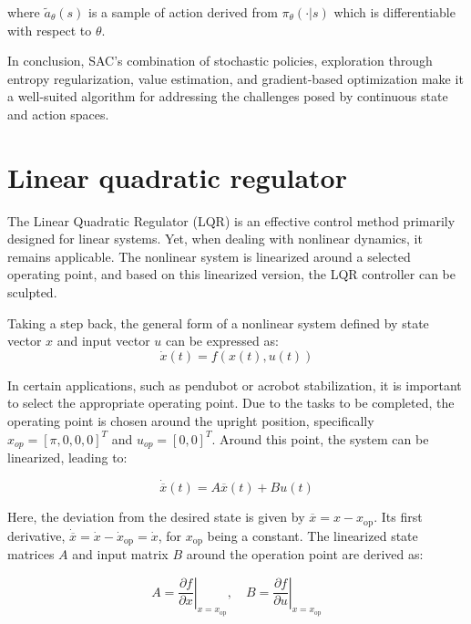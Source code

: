 where \(\widetilde{a}_{\theta}(s)\) is a sample of action derived from \(\pi_\theta(\cdot|s)\) which is differentiable with respect to \(\theta\). 

In conclusion, SAC's combination of stochastic policies, exploration through
entropy regularization, value estimation, and gradient-based optimization make
it a well-suited algorithm for addressing the challenges posed by continuous
state and action spaces.

\section{Linear quadratic regulator}
The Linear Quadratic Regulator (LQR)\cite{lehtomaki1981robustness} is an effective control method primarily designed for linear systems. Yet, when dealing with nonlinear dynamics, it remains applicable. The nonlinear system is linearized around a selected operating point, and based on this linearized version, the LQR controller can be sculpted.

Taking a step back, the general form of a nonlinear system defined by state vector \(x\) and input vector \(u\) can be expressed as:
\begin{equation}
 \dot{x}(t) = f(x(t), u(t))
\end{equation}

In certain applications, such as pendubot or acrobot stabilization, it is important to select the appropriate operating point. Due to the tasks to be completed, the operating point is chosen around the upright position, specifically \(x_{op} = [\pi,0,0,0]^T\) and \(u_{op} = [0,0]^T\). Around this point, the system can be linearized, leading to:

\begin{equation}
\dot{\overline{x}}(t) = A \overline{x}(t) + B u(t)
\end{equation}

Here, the deviation from the desired state is given by \(\overline{x} = x - x_{\text{op}}\). Its first derivative, \(\dot{\overline{x}} = \dot{x} - \dot{x}_{\text{op}} = \dot{x}\), for \(x_{\text{op}}\) being a constant. The linearized state matrices \(A\) and input matrix \(B\) around the operation point are derived as:

\begin{equation}
A = \left.\frac{\partial f}{\partial x}\right|_{x = x_{\text{op}}}, \quad B = \left.\frac{\partial f}{\partial u}\right|_{x = x_{\text{op}}}
\end{equation}

